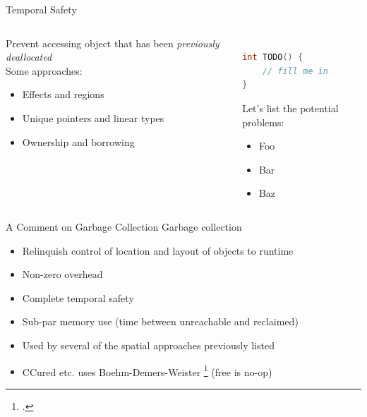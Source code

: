 \documentclass[aspectratio=169]{beamer}
\begin{document}
\begin{frame}[fragile]{Temporal Safety}
  \footnotesize
  \begin{columns}[T]
    \begin{column}{0.45\textwidth}
        Prevent accessing object that has been \emph{previously deallocated}
        \\
        Some approaches:
        \begin{itemize}
            \item Effects and regions
            \item Unique pointers and linear types
            \item Ownership and borrowing
        \end{itemize}
    \end{column}
    \begin{column}{0.45\textwidth}
\begin{lstlisting}[language=C,mathescape] %,basicstyle={\footnotesize\ttfamily}]

int TODO() {
    // fill me in
}
\end{lstlisting}
Let's list the potential problems:
        \begin{itemize}
            \item Foo
            \item Bar
            \item Baz
        \end{itemize}
    \end{column}
  \end{columns}
\end{frame}

\begin{frame}{A Comment on Garbage Collection}
Garbage collection
    \begin{itemize}
        \item Relinquish control of location and layout of objects to runtime
        \item Non-zero overhead
        \item Complete temporal safety
        \item Sub-par memory use (time between unreachable and reclaimed)
        \item Used by several of the spatial approaches previously listed
        \item CCured etc. uses Boehm-Demers-Weister \footcite{boehm_garbage_1988} (free is no-op)
    \end{itemize}
\end{frame}
\end{document}
